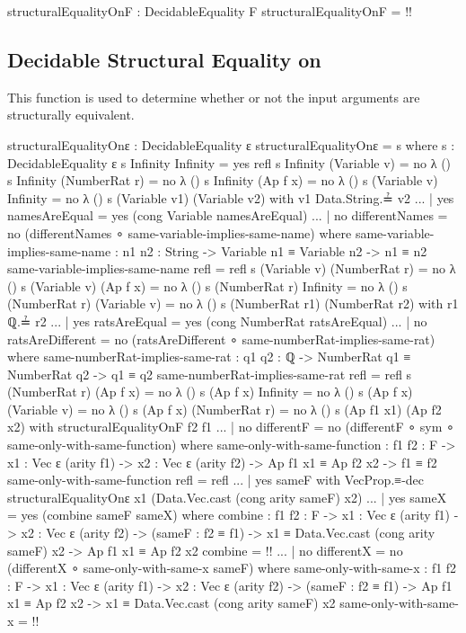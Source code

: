 \documentclass{report}
\begin{document}
\begin{code}
structuralEqualityOnF : DecidableEquality F
structuralEqualityOnF = {!!}
\end{code}

\subsection{Decidable Structural Equality on }
This function is used to determine whether or not the input arguments are structurally equivalent.

\begin{code}
structuralEqualityOnε : DecidableEquality ε
structuralEqualityOnε = s
  where
  s : DecidableEquality ε
  s Infinity Infinity = yes refl
  s Infinity (Variable v) = no λ ()
  s Infinity (NumberRat r) = no λ ()
  s Infinity (Ap f x) = no λ ()
  s (Variable v) Infinity = no λ ()
  s (Variable v1) (Variable v2) with v1 Data.String.≟ v2
  ... | yes namesAreEqual = yes (cong Variable namesAreEqual)
  ... | no differentNames = no (differentNames ∘ same-variable-implies-same-name)
    where
    same-variable-implies-same-name :
      {n1 n2 : String} ->
      Variable n1 ≡ Variable n2 ->
      n1 ≡ n2
    same-variable-implies-same-name refl = refl
  s (Variable v) (NumberRat r) = no λ ()
  s (Variable v) (Ap f x) = no λ ()
  s (NumberRat r) Infinity = no λ ()
  s (NumberRat r) (Variable v) = no λ ()
  s (NumberRat r1) (NumberRat r2) with r1 ℚ.≟ r2
  ... | yes ratsAreEqual = yes (cong NumberRat ratsAreEqual)
  ... | no ratsAreDifferent = no (ratsAreDifferent ∘ same-numberRat-implies-same-rat)
    where
    same-numberRat-implies-same-rat :
      {q1 q2 : ℚ} ->
      NumberRat q1 ≡ NumberRat q2 ->
      q1 ≡ q2
    same-numberRat-implies-same-rat refl = refl
  s (NumberRat r) (Ap f x) = no λ ()
  s (Ap f x) Infinity = no λ ()
  s (Ap f x) (Variable v) = no λ ()
  s (Ap f x) (NumberRat r) = no λ ()
  s (Ap f1 x1) (Ap f2 x2) with structuralEqualityOnF f2 f1
  ... | no differentF = no (differentF ∘ sym ∘ same-only-with-same-function)
    where
    same-only-with-same-function :
      {f1 f2 : F} ->
      {x1 : Vec ε (arity f1)} ->
      {x2 : Vec ε (arity f2)} ->
      Ap f1 x1 ≡ Ap f2 x2 ->
      f1 ≡ f2
    same-only-with-same-function refl = refl
  ... | yes sameF with VecProp.≡-dec structuralEqualityOnε x1 (Data.Vec.cast (cong arity sameF) x2)
  ... | yes sameX = yes (combine sameF sameX)
    where
    combine :
      {f1 f2 : F} ->
      {x1 : Vec ε (arity f1)} ->
      {x2 : Vec ε (arity f2)} ->
      (sameF : f2 ≡ f1) ->
      x1 ≡ Data.Vec.cast (cong arity sameF) x2 ->
      Ap f1 x1 ≡ Ap f2 x2
    combine = {!!}
  ... | no differentX = no (differentX ∘ same-only-with-same-x sameF)
    where
    same-only-with-same-x :
      {f1 f2 : F} ->
      {x1 : Vec ε (arity f1)} ->
      {x2 : Vec ε (arity f2)} ->
      (sameF : f2 ≡ f1) ->
      Ap f1 x1 ≡ Ap f2 x2 ->
      x1 ≡ Data.Vec.cast (cong arity sameF) x2
    same-only-with-same-x = {!!}
\end{code}
\end{document}
